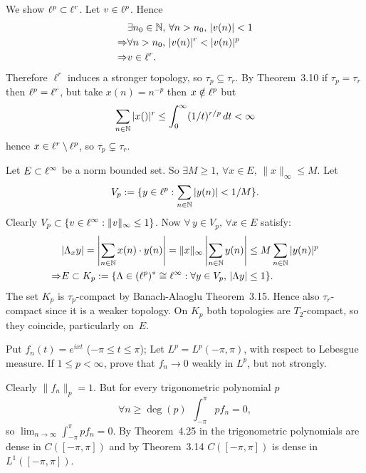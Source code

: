 \begin{enumerate}
\begin{itemize}
We show \(\ell^p \subset \ell^r\). Let \(v\in \ell^p\). Hence
\begin{align*}
& \exists n_0\in\mathbb{N},\,\forall n>n_0,\,|v(n)|<1 \\
\Rightarrow & \forall n>n_0,\, |v(n)|^r < |v(n)|^p \\
\Rightarrow & v\in \ell^r.
\end{align*}
Therefore \(\ell^r\) induces a stronger topology, so \(\tau_p \subseteq \tau_r\).
By Theorem~3.10 if \(\tau_p = \tau_r\) then \(\ell^p = \ell^r\),
but take \(x(n)=n^{-p}\) then \(x\notin \ell^p\)
but
\begin{equation*}
\sum_{n\in\mathbb{N}} |x()|^r \leq \int_0^\infty (1/t)^{r/p}\,dt  < \infty
\end{equation*}
hence \(x\in\ell^r\setminus\ell^p\), so \(\tau_p \subsetneq \tau_r\).

Let \(E\subset \ell^\infty\) be a norm bounded set.
So \(\exists M\geq 1,\,\forall x\in E,\,\|x\|_\infty \leq M\).
Let
\begin{equation*}
V_p := \{y\in\ell^p: \sum_{n\in\mathbb{N}} |y(n)|<1/M\}.
\end{equation*}
Clearly \(V_p \subset \{v\in\ell^\infty: \|v\|_\infty \leq 1\}\).
Now  \(\forall\, y\in V_p,\, \forall x\in E\) satisfy:
\begin{align*}
& |\Lambda_x y| = \left|\sum_{n\in\mathbb{N}} x(n)\cdot y(n)\right|
                = \|x\|_\infty \left|\sum_{n\in\mathbb{N}} y(n)\right|
                \leq M \sum_{n\in\mathbb{N}} |y(n)|^p \\
\Rightarrow &
  E \subset K_p :=
  \{\Lambda \in (\ell^p)^*\cong \ell^\infty: \forall y\in V_p,\, |\Lambda y|\leq 1\}.
\end{align*}
The set \(K_p\) is \(\tau_p\)-compact by
Banach-Alaoglu Theorem~3.15.
Hence also \(\tau_r\)-compact since it is a weaker topology.
On \(K_p\) both topologies are \(T_2\)-compact, so they coincide, particularly
on~$E$.
\end{itemize}


\begin{excopy}
Put \(f_n(t)=e^{ixt}\) (\(-\pi \leq t \leq \pi\)); Let
\(L^p = L^p(-\pi,\pi)\), with respect to Lebesgue measure.
If \(1\leq p < \infty\), prove that \(f_n\to 0\) weakly in \(L^p\),
but not strongly.
\end{excopy}

Clearly \(\|f_n\|_p = 1\). But for every trigonometric polynomial $p$
\begin{equation*}
\forall n \geq \deg(p)\,\; \int_{-\pi}^\pi p f_n = 0,
\end{equation*}
so \(\lim_{n\to\infty}\int_{-\pi}^{\pi} pf_n = 0\).
By Theorem~4.25 in \cite{RudinRCA87} the trigonometric polynomials
are dense in \(C([-\pi,\pi])\) and by Theorem~3.14 \cite{RudinRCA87}
\(C([-\pi,\pi])\) is dense in \(L^1([-\pi,\pi])\).


\end{enumerate}
